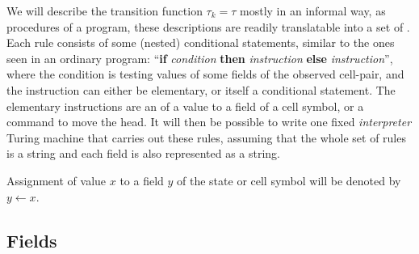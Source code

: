 \documentclass[11pt]{memoir}
\theoremstyle{definition} %
\newcommand{\fld}[1]{\ensuremath{\textit{#1\/}}}
\newcommand{\increment}[1]{#1\mathord{+}\mathord{+}}
\newcommand{\decrement}[1]{#1\mathord{-}\mathord{-}}
\newcommand{\Addr}{\fld{Addr}}
\newcommand{\Drift}{\fld{Drift}}
\newcommand{\Hold}{\fld{Hold}}
\begin{document}
We will describe the transition function
\( \tau_{k}=\tau \)  mostly in an informal way, as procedures of a program,
these descriptions are readily translatable into a set of .
Each rule consists of some (nested) conditional statements,
similar to the ones seen in an ordinary program:
 ``\textbf{if} \textit{condition} \textbf{then} \textit{instruction}
\textbf{else} \textit{instruction}'', 
where the condition is testing values of some fields of the observed cell-pair, and
the instruction can either be elementary, or itself a conditional statement. 
The elementary instructions are an  of a value to a field
of a cell symbol, or a command to move the head.
It will then be possible to write one fixed \emph{interpreter} Turing machine that carries
out these rules, assuming that the whole set of rules is a string and each field is also represented
as a string.

Assignment of value \( x \) to a field \( y \) of the state or cell symbol will
be denoted by \( y \gets x \).



\subsection{Fields}\label{sec:fields}


\end{document}
